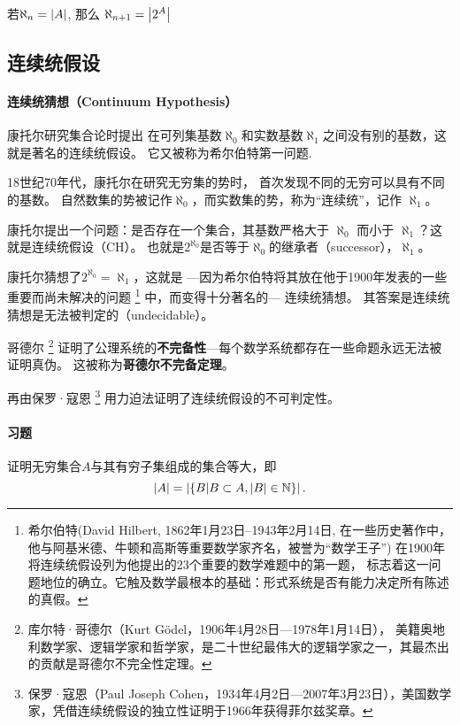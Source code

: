 \documentclass[UTF8]{mathrep}
\begin{document}
\begin{definition}[无穷基数]
	若$\aleph_n =\left\lvert A \right\rvert$, 那么 $\aleph_{n+1} = \left\lvert 2^{A}  \right\rvert$
\end{definition}


\subsection{连续统假设}

\paragraph{连续统猜想（Continuum Hypothesis）}
康托尔研究集合论时提出
在可列集基数$\aleph_0$和实数基数$\aleph_{1}$之间没有别的基数，这就是著名的连续统假设。 它又被称为希尔伯特第一问题.

\begin{note}
	18世纪70年代，康托尔在研究无穷集的势时，
	首次发现不同的无穷可以具有不同的基数。
	自然数集的势被记作$\aleph_{0}$，而实数集的势，称为“连续统”，记作 $\aleph_{1}$。

	康托尔提出一个问题：是否存在一个集合，其基数严格大于 $\aleph_{0}$ 而小于 $\aleph_{1}$？这就是连续统假设（CH）。
	也就是$2^{\aleph_0}$是否等于$\aleph_0$的继承者（successor），$\aleph_1$。

	康托尔猜想了$2^{\aleph_0}=\aleph_1$，这就是
	---因为希尔伯特将其放在他于1900年发表的一些重要而尚未解决的问题
	\footnote{希尔伯特(David Hilbert, 1862年1月23日--1943年2月14日,
		在一些历史著作中，他与阿基米德、牛顿和高斯等重要数学家齐名，被誉为“数学王子”)
		在1900年将连续统假设列为他提出的23个重要的数学难题中的第一题，
		标志着这一问题地位的确立。它触及数学最根本的基础：形式系统是否有能力决定所有陈述的真假。}
	中，而变得十分著名的---
	连续统猜想。
	其答案是连续统猜想是无法被判定的（undecidable）。
\end{note}

哥德尔
\footnote{库尔特·哥德尔（Kurt Gödel，1906年4月28日—1978年1月14日），
	美籍奥地利数学家、逻辑学家和哲学家，是二十世纪最伟大的逻辑学家之一，其最杰出的贡献是哥德尔不完全性定理。 }
证明了公理系统的\textbf{不完备性}---每个数学系统都存在一些命题永远无法被证明真伪。
这被称为\textbf{哥德尔不完备定理}。

再由保罗·寇恩
\footnote{保罗·寇恩（Paul Joseph Cohen，1934年4月2日---2007年3月23日），美国数学家，凭借连续统假设的独立性证明于1966年获得菲尔兹奖章。}
用力迫法证明了连续统假设的不可判定性。


\paragraph{习题}
证明无穷集合$A$与其有穷子集组成的集合等大，即
\[
	\left\lvert A \right\rvert = \left\lvert  \{ B| B \subset A, \left\lvert B \right\rvert \in \mathbb{N} \}   \right\rvert
	.\]

\end{document}
